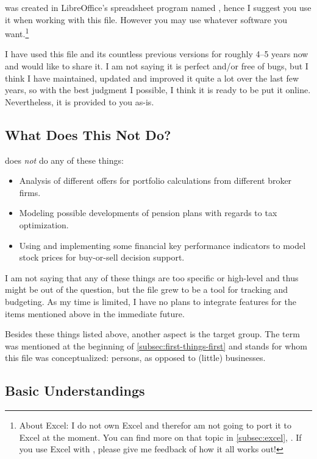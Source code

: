\tfn was created in LibreOffice's spreadsheet program named , hence I suggest you use it when working with this file.
However you may use whatever software you want.\footnote{About Excel: I do not own Excel and therefor am not going to port it to Excel at the moment.
You can find more on that topic in \autoref{subsec:excel}, .
If you use Excel with \tfn, please give me feedback of how it all works out!}

I have used this file and its countless previous versions for roughly 4--5 years now and would like to share it.
I am not saying it is perfect and/or free of bugs, but I think I have maintained, updated and improved it quite a lot over the last few years, so with the best judgment I possible, I think it is ready to be put it online.
Nevertheless, it is provided to you as-is.

\subsection{What Does This Not Do?}
\label{subsec:not-included}

\tfn does \emph{not} do any of these things:
\begin{itemize}
	\item Analysis of different offers for portfolio calculations from different broker firms.
	\item Modeling possible developments of pension plans with regards to tax optimization.
	\item Using and implementing some financial key performance indicators to model stock prices for buy-or-sell decision support.
\end{itemize}
I am not saying that any of these things are too specific or high-level and thus might be out of the question, but the file grew to be a tool for tracking and budgeting.
As my time is limited, I have no plans to integrate features for the items mentioned above in the immediate future.

Besides these things listed above, another aspect is the target group.
The term  was mentioned at the beginning of \autoref{subsec:first-things-first} and stands for whom this file was conceptualized: persons, as opposed to (little) businesses.

\subsection{Basic Understandings}
\label{subsec:basic-understandings}

